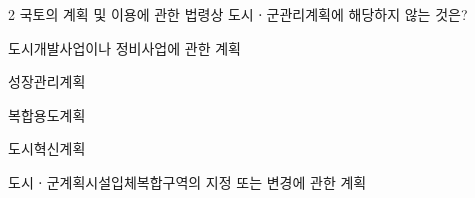 \begin{question}{2}
국토의 계획 및 이용에 관한 법령상 도시ㆍ군관리계획에 해당하지 않는 것은?
\begin{choices}
  \item 도시개발사업이나 정비사업에 관한 계획
  \item 성장관리계획
  \item 복합용도계획
  \item 도시혁신계획
  \item 도시ㆍ군계획시설입체복합구역의 지정 또는 변경에 관한 계획
\end{choices}
\end{question}
